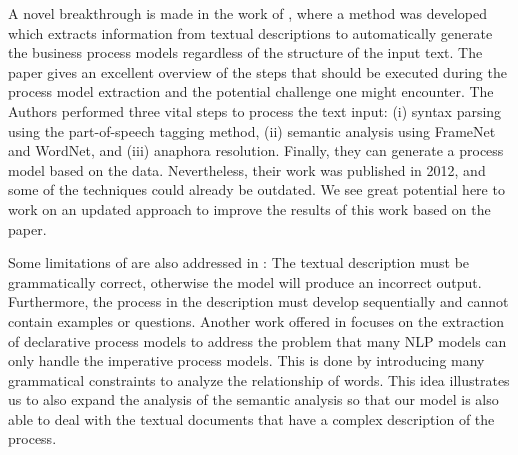 	A novel breakthrough is made in the work of \cite{t2m_1}, where a method was developed which extracts information from textual descriptions to automatically generate the business process models regardless of the structure of the input text. The paper gives an excellent overview of the steps that should be executed during the process model extraction and the potential challenge one might encounter. The Authors performed three vital steps to process the text input: (i) syntax parsing using the part-of-speech tagging method, (ii) semantic analysis using FrameNet and WordNet, and (iii) anaphora resolution. Finally, they can generate a process model based on the data. Nevertheless, their work was published in 2012, and some of the techniques could already be outdated. We see great potential here to work on an updated approach to improve the results of this work based on the paper.
	
	 Some limitations of \cite{t2m_1} are also addressed in \cite{pre_processing_1}: The textual description must be grammatically correct, otherwise the model will produce an incorrect output. Furthermore, the process in the description must develop sequentially and cannot contain examples or questions. Another work offered in \cite{t2m_2} focuses on the extraction of declarative process models to address the problem that many NLP models can only handle the imperative process models. This is done by introducing many grammatical constraints to analyze the relationship of words. This idea illustrates us to also expand the analysis of the semantic analysis so that our model is also able to deal with the textual documents that have a complex description of the process. 
	 

	
	
	
	